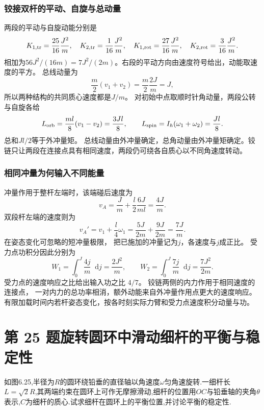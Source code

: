 \documentclass[UTF8,fontset=fandol,a4paper,11pt]{ctexart}
\newcommand{\dd}{\mathop{}\!\mathrm{d}}
\newcommand{\tagline}[1]{\noindent{\small\color{muted}#1}\par}
\begin{document}
\subsubsection*{铰接双杆的平动、自旋与总动量}
两段的平动与自旋动能分别是
\[
K_{1,\rm tr}=\frac{25}{16}\frac{J^2}m,\quad
K_{2,\rm tr}=\frac1{16}\frac{J^2}m,
\quad K_{1,\rm rot}=\frac{27}{16}\frac{J^2}m,\quad
K_{2,\rm rot}=\frac3{16}\frac{J^2}m.
\]
相加为$56J^2/(16m)=7J^2/(2m)$。右段的平动方向由速度符号给出，动能取速度的平方。
总线动量为
\[
\frac m2(v_1+v_2)=\frac m2\frac{2J}m=J,
\]
所以两种结构的共同质心速度都是$J/m$。
对初始中点取顺时针角动量，两段公转与自旋各给
\[
L_{\rm orb}=\frac{ml}{8}(v_1-v_2)=\frac{3Jl}{8},
\qquad
L_{\rm spin}=I_h(\omega_1+\omega_2)=\frac{Jl}{8}.
\]
总和$Jl/2$等于外冲量矩。
总线动量由外冲量确定，总角动量由外冲量矩确定。铰链只让两段在连接点具有相同速度，两段仍可绕各自质心以不同角速度转动。

\subsubsection*{相同冲量为何输入不同能量}
冲量作用于整杆左端时，该端碰后速度为
\[
v_A=\frac Jm+\frac l2\frac{6J}{ml}=\frac{4J}m.
\]
双段杆左端的速度则为
\[
v_A'=v_1+\frac l4\omega_1
=\frac{5J}{2m}+\frac{9J}{2m}=\frac{7J}m.
\]
在姿态变化可忽略的短冲量极限，
把已施加的冲量记为$j$，各速度与$j$成正比。
受力点功积分因此分别为
\[
W_1=\int_0^J\frac{4j}m\dd j=\frac{2J^2}m,
\qquad
W_2=\int_0^J\frac{7j}m\dd j=\frac{7J^2}{2m}.
\]
受力点的速度响应之比给出输入功之比 $4/7$。
铰链两侧的内力作用于相同速度的连接点，
一对内力的总功率相消，额外动能来自外冲量作用点更大的速度响应。
有限加载时间内若杆姿态变化，按各时刻实际力臂和受力点速度积分动量与功。




\section*{第 25 题\quad 旋转圆环中滑动细杆的平衡与稳定性}

\tagline{M-06-25}

如图6.25,半径为\(R\)的圆环绕铅垂的直径轴以角速度\(\omega\)匀角速旋转.一细杆长\(L=\sqrt{2}R\),其两端约束在圆环上可作无摩擦滑动,细杆的位置用\(OC\)与铅垂轴的夹角\(\theta\)表示,\(C\)为细杆的质心.试求细杆在圆环上的平衡位置,并讨论平衡的稳定性.
\end{document}

